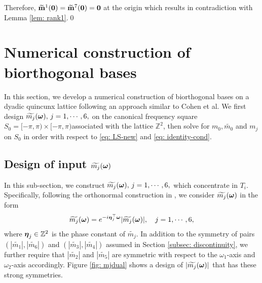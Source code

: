 Therefore, $\widetilde{\mathbf{m}}^{1}(\boldsymbol{0}) = \widetilde{\mathbf{m}}^{7}(\boldsymbol{0}) = \mathbf{0}$ at the origin which results in contradiction with Lemma \ref{lem: rank1}.\qed%

\section{Numerical construction of biorthogonal bases}\label{sec: solve-quincunx}
In this section, we develop a numerical construction of biorthogonal bases on a dyadic quincunx lattice following an approach similar to Cohen et al. We first design $\widetilde{m_{j}}(\boldsymbol{\omega}),\,j = 1,\cdots,6,$ on the canonical frequency square $S_0 = [-\pi,\pi)\times[-\pi,\pi)$associated with the lattice $\mathbb{Z}^2$, then solve for $m_0,\widetilde{m_0}$ and $m_j$ on $S_0$ in order with respect to \eqref{eq: LS-new} and \eqref{eq: identity-cond}.

\subsection{Design of input $\widetilde{m_{j}}(\boldsymbol{\omega})$}\label{sec: phase-design}
In this sub-section, we construct $\widetilde{m_{j}}(\boldsymbol{\omega}),\, j = 1,\cdots,6,$ which concentrate in $T_i$.
Specifically, following the orthonormal construction in \cite{yin2014orthshear}, we consider $\widetilde{m_{j}}(\boldsymbol{\omega})$ in the form 
\begin{align}\label{eq: m-form}
\widetilde{m_{j}}(\boldsymbol{\omega}) = e^{-i\boldsymbol{\eta}_j^\top\boldsymbol{\omega}}|\widetilde{m_{j}}(\boldsymbol{\omega})|,\quad j = 1,\cdots,6,
\end{align}
where $\boldsymbol{\eta}_j\in\mathbb{Z}^2$ is the phase constant of $\widetilde{m_j}$. In addition to the symmetry of pairs $(|\widetilde{m_1}|, |\widetilde{m_6}|)$ and $(|\widetilde{m_3}|, |\widetilde{m_4}|)$ assumed in Section \ref{subsec: discontinuity}, we further require that $|\widetilde{m_2}|$ and $|\widetilde{m_5}|$ are symmetric with respect to the $\omega_1$-axis and $\omega_2$-axis accordingly.
Figure \ref{fig: mjdual} shows a design of $|\widetilde{m_{j}}(\boldsymbol{\omega})|$ that has these strong symmetries.
 
